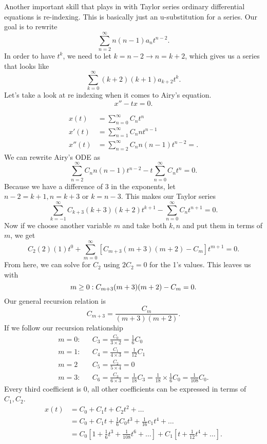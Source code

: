 Another important skill that plays in with Taylor series ordinary differential equations is re-indexing. This is basically just an u-substitution for a series. Our goal is to rewrite
\[
  \sum_{n=2}^{\infty} n(n-1)a_nt ^{n-2}
.\] 
In order to have $t ^{k}$, we need to let $k=n-2\to n=k+2$, which gives us a series that looks like 
\[
  \sum_{k=0}^{\infty} (k+2)(k+1)a_{k+2}t ^{k}
.\] 
Let's take a look at re indexing  when it comes to Airy's equation.
\[
x''-tx=0
.\] 
\begin{eg}
  \begin{align*}
    x(t)&=\sum_{n=0}^{\infty} C_nt^n\\
    x'(t)&=\sum_{n=1}^{\infty} C_nnt ^{n-1}\\
    x''(t)&=\sum_{n=2}^{\infty} C_nn(n-1)t ^{n-2}=
  .\end{align*}
  We can rewrite Airy's ODE as 
  \[
    \sum_{n=2}^{\infty} C_nn(n-1)t ^{n-2}-t \sum_{n=0}^{\infty} C_nt ^{n}=0
  .\] 
  Because we have a difference of 3 in the exponents, let $n-2 = k + 1, n=k+3 \text{ or } k=n-3$. This makes our Taylor series 
  \[
    \sum_{k=-1}^{\infty} C_{k+3}(k+3)(k+2)t ^{k+1}-\sum_{n=0}^{\infty} C_nt ^{n+1}=0
  .\] 
  Now if we choose another variable $m$ and take both $k,n$ and put them in terms of $m$, we get
  \[
    C_2(2)(1)t ^{0}+\sum_{m=0}^{\infty} \left[ C_{m+3}(m+3)(m+2)-C_m \right] t ^{m+1}=0
  .\] 
  From here, we can solve for $C_2$ using $2C_2=0$ for the 1's values. This leaves us with 
  \[
    m\ge 0:C_{m+3}(m+3)(m+2)-C_m=0\\
  .\] 
  Our general recursion relation is 
  \[
    C_{m+3}=\frac{C_m}{(m+3)(m+2)}
  .\] 
  If we follow our recursion relationship
  \begin{align*}
    m=0:&&C_3=\frac{C_0}{3\times2}=\frac{1}{6}C_0\\
    m=1:&&C_4=\frac{C_1}{4\times 3}=\frac{1}{12}C_1\\
    m=2&&C_5=\frac{C_2}{5\times 4}=0\\
    m=3:&&C_6=\frac{C_3}{6\times 3}=\frac{1}{18}C_3=\frac{1}{18}\times \frac{1}{6}C_0=\frac{1}{108}C_0
  .\end{align*}
  Every third coefficient is 0, all other coefficients can be expressed in terms of $C_1,C_2$.
  \begin{align*}
    x(t)&=C_0+C_1t+C_2t^2+\ldots\\
        &=C_0+C_1t+\frac{1}{6}C_0t^3+\frac{1}{16}c_1t ^{4}+\ldots\\
        &=C_0\left[ 1+\frac{1}{6}t^3+\frac{1}{108}t ^{6}+\ldots \right] + C_1\left[ t+\frac{1}{12}t ^{4}+\ldots \right]  
  .\end{align*}
\end{eg}
